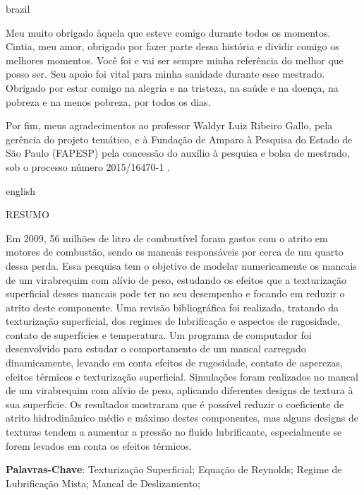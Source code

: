 \begin{otherlanguage*}{brazil}
\begin{agradecimentos}
Meu muito obrigado àquela que esteve comigo durante todos os momentos. Cintia, meu amor, obrigado por fazer parte dessa história e dividir comigo os melhores momentos. Você foi e vai ser sempre minha referência do melhor que posso ser. Seu apoio foi vital para minha sanidade durante esse mestrado. Obrigado por estar comigo na alegria e na tristeza, na saúde e na doença, na pobreza e na menos pobreza, por todos os dias.

Por fim, meus agradecimentos ao professor Waldyr Luiz Ribeiro Gallo, pela gerência do projeto temático, e à Fundação de Amparo à Pesquisa do Estado de São Paulo (FAPESP) pela concessão do auxílio à pesquisa e bolsa de mestrado, sob o processo número 2015/16470-1 .  


\end{agradecimentos}
\end{otherlanguage*}


\begin{otherlanguage*}{english}
	\begin{center}{\ABNTEXchapterfont\ABNTEXchapterfontsize RESUMO}\end{center}

Em 2009, 56 milhões de litro de combustível foram gastos com o atrito em motores de combustão, sendo os mancais responsáveis por cerca de um quarto dessa perda. Essa pesquisa tem o objetivo de modelar numericamente os mancais de um virabrequim com alívio de peso, estudando os efeitos que a texturização superficial desses mancais pode ter no seu desempenho e focando em reduzir o atrito deste componente. Uma revisão bibliográfica foi realizada, tratando da texturização superficial, dos regimes de lubrificação e aspectos de rugosidade, contato de superfícies e temperatura. Um programa de computador foi desenvolvido para estudar o comportamento de um mancal carregado dinamicamente, levando em conta efeitos de rugosidade, contato de asperezas, efeitos térmicos e texturização superficial. Simulações foram realizados no mancal de um virabrequim com alívio de peso, aplicando diferentes designs de textura à sua superfície. Os resultados mostraram que é possível reduzir o coeficiente de atrito hidrodinâmico médio e máximo destes componentes, mas alguns designs de texturas tendem a aumentar a pressão no fluido lubrificante, especialmente se forem levados em conta os efeitos térmicos.  

\noindent\textbf{Palavras-Chave}: Texturização Superficial; Equação de Reynolds; Regime de Lubrificação Mista; Mancal de Deslizamento; 

\end{otherlanguage*}

